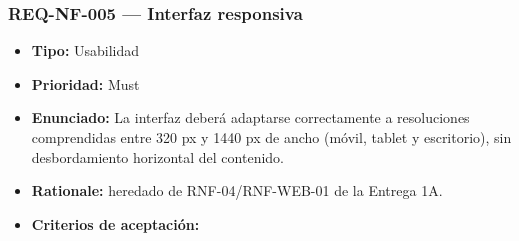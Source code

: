\documentclass[
  spanish,
]{article}
\providecommand{\tightlist}{%
  \setlength{\itemsep}{0pt}\setlength{\parskip}{0pt}}
\begin{document}
\subsubsection{REQ-NF-005 --- Interfaz
responsiva}\label{req-nf-005-interfaz-responsiva}

\begin{itemize}
\tightlist
\item
  \textbf{Tipo:} Usabilidad
\item
  \textbf{Prioridad:} Must
\item
  \textbf{Enunciado:} La interfaz deberá adaptarse correctamente a
  resoluciones comprendidas entre 320 px y 1440 px de ancho (móvil,
  tablet y escritorio), sin desbordamiento horizontal del contenido.
\item
  \textbf{Rationale:} heredado de RNF-04/RNF-WEB-01 de la Entrega 1A.
\item
  \textbf{Criterios de aceptación:}


\end{itemize}
\end{document}
